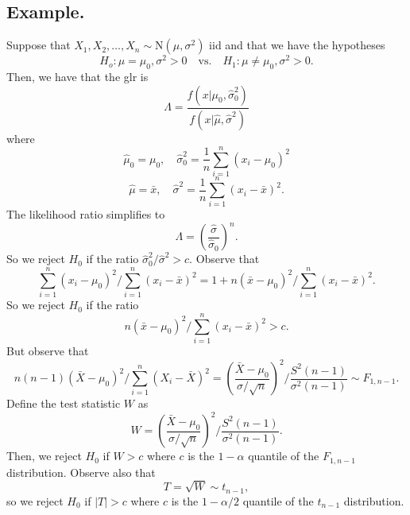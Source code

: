 \documentclass[titlepage]{article}
\begin{document}
\subsection{Example.} Suppose that $X_{1}, X_{2}, \ldots, X_{n} \sim \text{N}(\mu, \sigma^{2})$ iid and that we have the hypotheses 
$$H_{o}: \mu = \mu_{0}, \sigma^{2} > 0 \quad \text{vs.} \quad H_{1}: \mu \neq \mu_{0}, \sigma^{2} > 0.$$
Then, we have that the glr is 
$$\Lambda = \frac{f(x|\mu_{0}, \hat{\sigma}_{0}^{2})}{f(x|\hat{\mu}, \hat{\sigma}^{2})}$$
where 
$$\hat{\mu}_{0} = \mu_{0}, \quad \hat{\sigma}_{0}^{2} = \frac{1}{n}\sum_{i=1}^{n}(x_{i} - \mu_{0})^{2}$$
$$\hat{\mu} = \bar{x}, \quad \hat{\sigma}^{2} = \frac{1}{n}\sum_{i=1}^{n}(x_{i} - \bar{x})^{2}.$$
The likelihood ratio simplifies to 
$$\Lambda = \left(\frac{\hat{\sigma}}{\hat{\sigma}_{0}}\right)^{n}.$$
So we reject $H_{0}$ if the ratio $\hat{\sigma}^{2}_{0}/\hat{\sigma}^{2} > c$. Observe that 
$$\sum_{i=1}^{n}(x_{i}-\mu_{0})^{2} / \sum_{i=1}^{n}(x_{i}-\bar{x})^{2} = 1 + n(\bar{x} - \mu_{0})^{2}/\sum_{i=1}^{n}(x_{i}-\bar{x})^{2}.$$
So we reject $H_{0}$ if the ratio
$$n(\bar{x} - \mu_{0})^{2}/\sum_{i=1}^{n}(x_{i}-\bar{x})^{2} > c.$$
But observe that 
$$n(n-1)(\bar{X} - \mu_{0})^{2}/\sum_{i=1}^{n}(X_{i} - \bar{X})^{2} = \left(\frac{\bar{X}-\mu_{0}}{\sigma/\sqrt{n}}\right)^{2} / \frac{S^{2}(n-1)}{\sigma^{2}(n-1)} \sim F_{1, n-1}.$$
Define the test statistic $W$ as 
$$W = \left(\frac{\bar{X}-\mu_{0}}{\sigma/\sqrt{n}}\right)^{2} / \frac{S^{2}(n-1)}{\sigma^{2}(n-1)}.$$
Then, we reject $H_{0}$ if $W > c$ where $c$ is the $1-\alpha$ quantile of the $F_{1, n-1}$ distribution. Observe also that 
$$T = \sqrt{W} \sim t_{n-1},$$
so we reject $H_{0}$ if $|T| > c$ where $c$ is the $1-\alpha/2$ quantile of the $t_{n-1}$ distribution.
\end{document}
